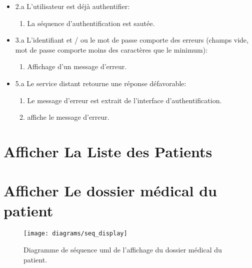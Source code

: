 \begin{description}
\begin{itemize}

\item 2.a L'utilisateur est déjà authentifier:

\begin{enumerate}

\item La séquence d'authentification est sautée.

\end{enumerate}

\item 3.a L’identifiant et / ou le mot de passe comporte des erreurs (champs vide, mot de passe comporte moins des caractères que le minimum):

\begin{enumerate}

\item Affichage d'un message d'erreur.

\end{enumerate}

\item 5.a Le service distant retourne une réponse défavorable:

\begin{enumerate}

\item Le message d'erreur est extrait de l'interface d'authentification.

\item {} affiche le message d'erreur.

\end{enumerate}

\end{itemize}

\end{description}

\section{Afficher La Liste des Patients}
\section{Afficher Le dossier médical du patient}

\begin{figure}
\center
\texttt{[image: diagrams/seq\_display]}
\caption{Diagramme de séquence \gls{uml} de l'affichage du dossier médical du patient.}
\label{fig:seq_display}
\end{figure}

